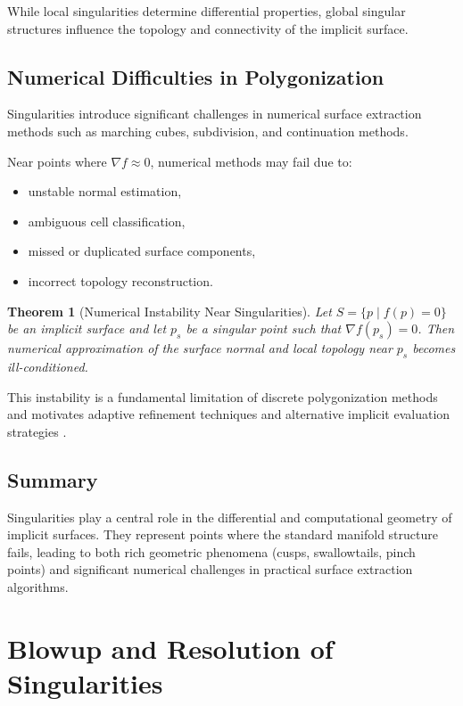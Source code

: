 \documentclass[12pt, a4paper, oneside]{book}
\theoremstyle{plain}
\newtheorem{theorem}{Theorem}[chapter]
\theoremstyle{definition}
\theoremstyle{remark}
\theoremstyle{definition}
\begin{document}
While local singularities determine differential properties, global singular structures influence the topology and connectivity of the implicit surface.

\subsection{Numerical Difficulties in Polygonization}

Singularities introduce significant challenges in numerical surface extraction methods such as marching cubes, subdivision, and continuation methods.

Near points where $\nabla f \approx 0$, numerical methods may fail due to:
\begin{itemize}
    \item unstable normal estimation,
    \item ambiguous cell classification,
    \item missed or duplicated surface components,
    \item incorrect topology reconstruction.
\end{itemize}

\begin{theorem}[Numerical Instability Near Singularities]
Let $S = \{p \mid f(p)=0\}$ be an implicit surface and let $p_s$ be a singular point such that $\nabla f(p_s)=0$. Then numerical approximation of the surface normal and local topology near $p_s$ becomes ill-conditioned.
\end{theorem}

This instability is a fundamental limitation of discrete polygonization methods and motivates adaptive refinement techniques and alternative implicit evaluation strategies \cite{bloomenthal2000implicit}.

\subsection*{Summary}

Singularities play a central role in the differential and computational geometry of implicit surfaces. They represent points where the standard manifold structure fails, leading to both rich geometric phenomena (cusps, swallowtails, pinch points) and significant numerical challenges in practical surface extraction algorithms.

\section{Blowup and Resolution of Singularities}
\end{document}
